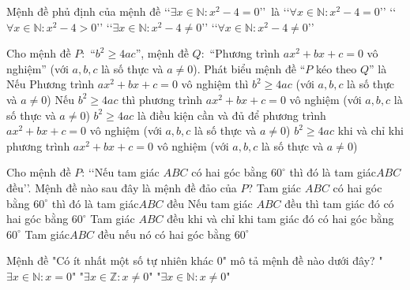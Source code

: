 \begin{ex}%
	Mệnh đề phủ định của mệnh đề \lq \lq $\exists x\in \mathbb{N}\colon x^2-4=0$\rq \rq \ là
	\choice
	{\lq \lq $\forall x\in \mathbb{N}\colon x^2-4=0$\rq \rq }
	{\lq \lq $\forall x\in \mathbb{N}\colon x^2-4>0$\rq \rq }
	{\lq \lq $\exists x\in \mathbb{N}\colon x^2-4\ne 0$\rq \rq }
	{\True \lq \lq $\forall x\in \mathbb{N}\colon x^2-4\ne 0$\rq \rq}
\end{ex}
\begin{ex}%
	Cho mệnh đề $P\colon$ ``$b^2\ge 4ac$'', mệnh đề $Q\colon$ ``Phương trình $ax^2 +bx+c=0$ vô nghiệm'' (với $a,b,c$ là số thực và $a\ne 0$). Phát biểu mệnh đề ``$P$ kéo theo $Q$'' là
	\choice
	{Nếu Phương trình $ax^2 +bx+c=0$ vô nghiệm thì $b^2\ge 4ac$ (với $a,b,c$ là số thực và $a\ne 0$)}
	{\True Nếu $b^2\ge 4ac$ thì phương trình $ax^2 +bx+c=0$ vô nghiệm (với $a,b,c$ là số thực và $a\ne 0$) }
	{$b^2\ge 4ac$ là điều kiện cần và đủ để phương trình $ax^2 +bx+c=0$ vô nghiệm (với $a,b,c$ là số thực và $a\ne 0$)}
	{$b^2\ge 4ac$ khi và chỉ khi phương trình $ax^2 +bx+c=0$ vô nghiệm (với $a,b,c$ là số thực và $a\ne 0$)}
\end{ex}
\begin{ex}%
	Cho mệnh đề $P$: \lq\lq  Nếu tam giác $ABC$ có hai góc bằng $60^{\circ}$ thì đó là tam giác$ABC$ đều\rq\rq. Mệnh đề nào sau đây là mệnh đề đảo của $P$?
	\choice
	{Tam giác $ABC$ có hai góc bằng $60^{\circ}$ thì đó là tam giác$ABC$ đều}
	{\True Nếu tam giác $ABC$ đều thì tam giác đó có hai góc bằng $60^{\circ}$}
	{Tam giác $ABC$ đều khi và chỉ khi tam giác đó có hai góc bằng $60^{\circ}$}
	{Tam giác$ABC$ đều nếu nó có hai góc bằng $60^{\circ}$}
\end{ex}
\begin{ex}%
	Mệnh đề "Có ít nhất một số tự nhiên khác 0" mô tả mệnh đề nào dưới đây?
	{"$\exists x\in\mathbb{N}:x=0$"}
	{"$\exists x\in\mathbb{Z}: x\neq 0$"}
	{\True "$\exists x\in\mathbb{N}:x\neq 0$"}
\end{ex}
